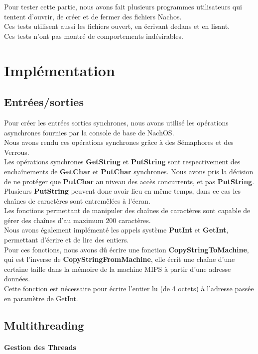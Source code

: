 \documentclass{report}
\newcommand{\myparagraph}[1]{\paragraph*{#1}\mbox{}\\}
\begin{document}
Pour tester cette partie, nous avons fait plusieurs programmes utilisateurs qui tentent d'ouvrir, de créer et de fermer des fichiers Nachos.\\
Ces tests utilisent aussi les fichiers ouvert, en écrivant dedans et en lisant.\\

Ces tests n'ont pas montré de comportements indésirables. 
\section*{Implémentation}
\subsection*{Entrées/sorties}

Pour créer les entrées sorties synchrones, nous avons utilisé les opérations asynchrones fournies par la console de base de NachOS.\\
Nous avons rendu ces opérations synchrones grâce à des Sémaphores et des Verrous.\\
Les opérations synchrones \textbf{GetString} et \textbf{PutString} sont respectivement des enchaînements de \textbf{GetChar} et \textbf{PutChar} synchrones.
Nous avons pris la décision de ne protéger que \textbf{PutChar} au niveau des accès concurrents, et pas \textbf{PutString}. Plusieurs \textbf{PutString} peuvent donc avoir lieu en même temps, dans ce cas les chaînes de caractères sont entremêlées à l'écran.\\
Les fonctions permettant de manipuler des chaînes de caractères sont capable de gérer des chaînes d'au maximum 200 caractères.\\

Nous avons également implémenté les appels système \textbf{PutInt} et \textbf{GetInt}, permettant d'écrire et de lire des entiers.\\
Pour ces fonctions, nous avons dû écrire une fonction \textbf{CopyStringToMachine}, qui est l'inverse de \textbf{CopyStringFromMachine}, elle écrit une chaîne d'une certaine taille dans la mémoire de la machine MIPS à partir d'une adresse données.\\
Cette fonction est nécessaire pour écrire l'entier lu (de 4 octets) à l'adresse passée en paramètre de GetInt.
\subsection*{Multithreading}
\myparagraph{Gestion des Threads}
\end{document}

